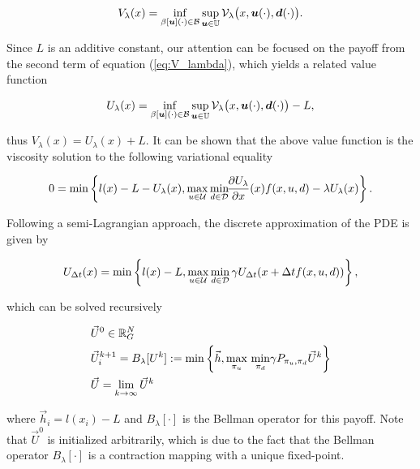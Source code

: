 \documentclass[letterpaper, 10 pt, conference]{ieeeconf}
\begin{document}
\begin{equation}
V_{\lambda}(x)=\inf_{\beta[\bm{u}](\cdot) \in \mathcal{B}} \sup_{\bm{u} \in \mathbb{U}}\mathcal{V}_{\lambda}\big(x,\bm{u}(\cdot),\bm{d}(\cdot)\big).
\end{equation}


Since $L$ is an additive constant, our attention can be focused on the payoff from the second term of equation (\ref{eq:V_lambda}), which yields a related value function

\begin{equation}
U_{\lambda}(x)=\inf_{\beta[\bm{u}](\cdot) \in \mathcal{B}} \sup_{\bm{u} \in \mathbb{U}}\mathcal{V}_{\lambda}\big(x,\bm{u}(\cdot),\bm{d}(\cdot)\big)-L, 
\end{equation}

\noindent thus $V_{\lambda}(x) = U_{\lambda}(x)+L$. It can be shown that the above value function is the viscosity solution to the following variational equality

\begin{equation}\label{eq:HJI_lambda}
    0 = \min\left\{l(x)-L-U_{\lambda}(x), \max_{u\in\mathcal{U}} \min_{ d\in\mathcal{D}} \!\!\frac{\partial U_{\lambda}}{\partial x}(x) f(x,u, d) - \lambda U_{\lambda}(x)\right\}.
\end{equation}

Following a semi-Lagrangian approach, the discrete approximation of the PDE is given by

\begin{equation}\label{eq:U_lambda_approx}
    U_{\Delta t} (x) = \min\left\{l(x)-L, \max_{u\in\mathcal{U}} \min_{ d\in\mathcal{D}}  \gamma U_{\Delta t}(x+\Delta tf(x,u,d))\right\},
\end{equation}

\noindent which can be solved recursively


\begin{subequations}\label{eq:dp_bellman_lambda}
\begin{align}
&\vec{U}^{0} \in \mathbb{R}^N_G\\
&\vec{U}_{i}^{k+1} = B_\lambda[U^k] := \min\left\{ \vec{h}, \underset{\pi_u}{\max}\text{ }\underset{ \pi_d}{\min} \gamma P_{\pi_u, \pi_d} \vec{U}^k \right \}  \\
&\vec{U} = \lim_{k\rightarrow \infty} \vec{U}^{k}
\end{align}
\end{subequations}

\noindent where $\vec{h}_i = l(x_i)-L$ and $B_{\lambda}[\cdot]$ is the Bellman operator for this payoff. Note that $\vec{U}^{0}$ is initialized arbitrarily, which is due to the fact that the Bellman operator $B_{\lambda}[\cdot]$ is a contraction mapping with a unique fixed-point. 
\end{document}
